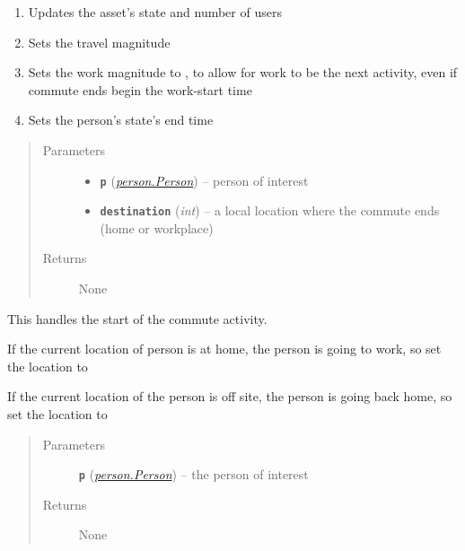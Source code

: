 \documentclass[letterpaper,10pt,english]{sphinxmanual}
\begin{document}
\begin{fulllineitems}
\begin{fulllineitems}
\begin{enumerate}
\item {} 
Updates the asset's state and number of users

\item {} 
Sets the travel magnitude

\item {} 
Sets the work magnitude to , to allow for work         to be the next activity, even if commute ends begin the work-start time

\item {} 
Sets the person's state's end time

\end{enumerate}
\begin{quote}\begin{description}
\item[{Parameters}] \leavevmode\begin{itemize}
\item {} 
\textbf{\texttt{p}} ({\hyperref[person:person.Person]{\emph{\emph{person.Person}}}}) -- person of interest

\item {} 
\textbf{\texttt{destination}} (\emph{int}) -- a local location where the commute ends (home or workplace)

\end{itemize}

\item[{Returns}] \leavevmode
None

\end{description}\end{quote}

\end{fulllineitems}


\begin{fulllineitems}
\label{commute:commute.Commute_From_Work.start}
This handles the start of the commute activity.

If the current location of person is at home, the person is going to work, so set the         location to 

If the current location of the person is off site, the person is going back home, so         set the location to 
\begin{quote}\begin{description}
\item[{Parameters}] \leavevmode
\textbf{\texttt{p}} ({\hyperref[person:person.Person]{\emph{\emph{person.Person}}}}) -- the person of interest

\item[{Returns}] \leavevmode
None

\end{description}\end{quote}

\end{fulllineitems}


\end{fulllineitems}
\end{document}
